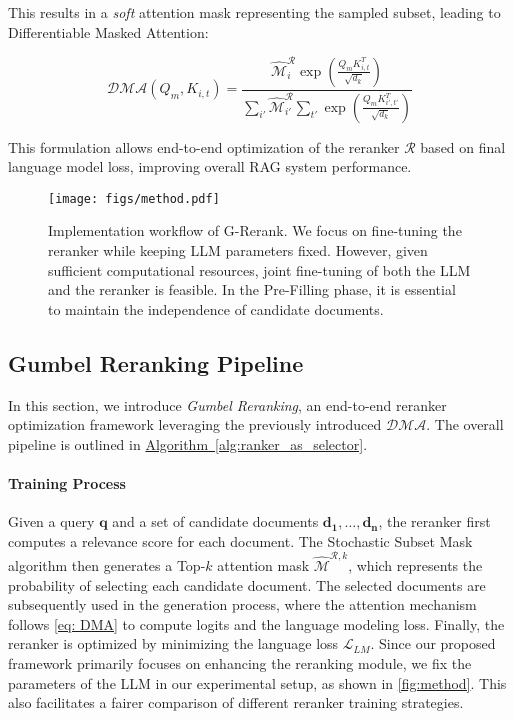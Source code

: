 This results in a \textit{soft} attention mask representing the sampled subset, leading to Differentiable Masked Attention:

\begin{equation}\label{eq: DMA}
    \mathcal{DMA}(Q_m, K_{i,t}) = \frac{\hat{\mathcal{M}}^{\mathcal{R}}_i \exp \left(\frac{Q_m K_{i,t}^T}{\sqrt{d_k}}\right)}{\sum_{i'} \hat{\mathcal{M}}^{\mathcal{R}}_{i'} \sum_{t'} \exp \left(\frac{Q_m K_{i',t'}^T}{\sqrt{d_k}}\right)}
\end{equation}

This formulation allows end-to-end optimization of the reranker $\mathcal{R}$ based on final language model loss, improving overall RAG system performance.


\begin{figure*}[!th]
  \texttt{[image: figs/method.pdf]}
  \centering
\caption{Implementation workflow of G-Rerank. We focus on fine-tuning the reranker while keeping LLM parameters fixed. However, given sufficient computational resources, joint fine-tuning of both the LLM and the reranker is feasible. In the Pre-Filling phase, it is essential to maintain the independence of candidate documents.}
\label{fig:method}
\end{figure*}


\subsection{Gumbel Reranking Pipeline}

In this section, we introduce \textit{Gumbel Reranking}, an end-to-end reranker optimization framework leveraging the previously introduced $\mathcal{DMA}$. The overall pipeline is outlined in \hyperref[alg:ranker_as_selector]{Algorithm~\ref{alg:ranker_as_selector}}.

\paragraph{Training Process} 
Given a query $\mathbf{q}$ and a set of candidate documents $\mathbf{d_1}, \dots, \mathbf{d_n}$, the reranker first computes a relevance score for each document. The Stochastic Subset Mask algorithm then generates a Top-$k$ attention mask $\hat{\mathcal{M}}^{\mathcal{R},k}$, which represents the probability of selecting each candidate document. The selected documents are subsequently used in the generation process, where the attention mechanism follows \autoref{eq: DMA} to compute logits and the language modeling loss. Finally, the reranker is optimized by minimizing the language loss $\mathcal{L}_{LM}$. Since our proposed framework primarily focuses on enhancing the reranking module, we fix the parameters of the LLM in our experimental setup, as shown in \autoref{fig:method}. This also facilitates a fairer comparison of different reranker training strategies.

